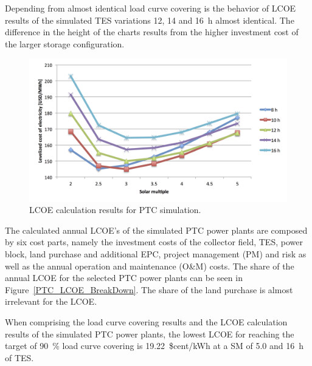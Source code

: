 Depending from almost identical load curve covering is the behavior of LCOE results of the simulated TES variations 12, 14 and 16~h almost identical. The difference in the height of the charts results from the higher investment cost of the larger storage configuration.

\begin{figure}[htbp]  
\centering
\includegraphics[width=1\linewidth]{FIG/PTC_LCOE}
\caption[LCOE calculation results for PTC simulation.]{LCOE calculation results for PTC simulation.}\label{PTC_LCOE}
\end{figure}
The calculated annual LCOE's of the simulated PTC power plants are composed by six cost parts, namely the investment costs of the collector field, TES, power block, land purchase and additional EPC, project management (PM) and risk as well as the annual operation and maintenance (O\&M) costs. The share of the annual LCOE for the selected PTC power plants can be seen in Figure~\ref{PTC_LCOE_BreakDown}. The share of the land purchase is almost irrelevant for the LCOE. 

When comprising the load curve covering results and the LCOE calculation results of the simulated PTC power plants, the lowest LCOE for reaching the target of 90~\% load curve covering is 19.22~\$cent/kWh at a SM of 5.0 and 16~h of TES. 

